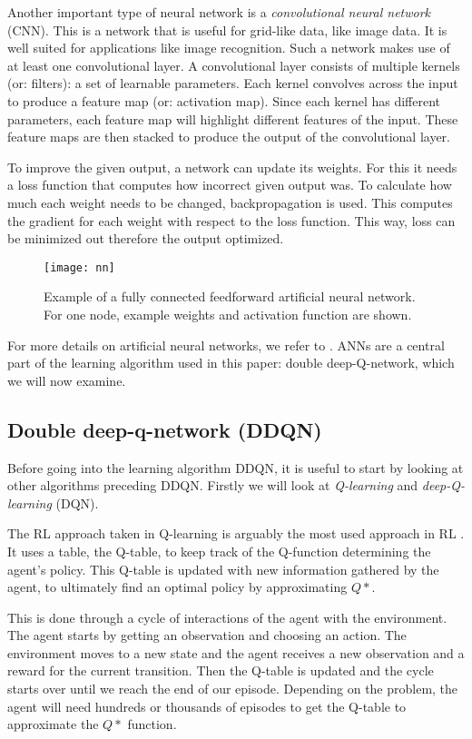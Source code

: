 Another important type of neural network is a \emph{convolutional neural network} (CNN). This is a network that is useful for grid-like data, like image data. It is well suited for applications like image recognition. Such a network makes use of at least one convolutional layer. A convolutional layer consists of multiple kernels (or: filters): a set of learnable parameters. Each kernel convolves across the input to produce a feature map (or: activation map). Since each kernel has different parameters, each feature map will highlight different features of the input. These feature maps are then stacked to produce the output of the convolutional layer.

To improve the given output, a network can update its weights. For this it needs a loss function that computes how incorrect given output was. To calculate how much each weight needs to be changed, backpropagation is used. This computes the gradient for each weight with respect to the loss function. This way, loss can be minimized out therefore the output optimized.

\begin{figure}[h]
    \centering
    \texttt{[image: nn]}
    \caption{Example of a fully connected feedforward artificial neural network. For one node, example weights and activation function are shown.}
    \label{fig:nn}
\end{figure}

For more details on artificial neural networks, we refer to \cite{nn}. ANNs are a central part of the learning algorithm used in this paper: double deep-Q-network, which we will now examine.

\subsection{Double deep-q-network (DDQN)}\label{pl-dqn}
Before going into the learning algorithm DDQN, it is useful to start by looking at other algorithms preceding DDQN. Firstly we will look at \emph{Q-learning} and \emph{deep-Q-learning} (DQN). 

The RL approach taken in Q-learning is arguably the most used approach in RL \cite{qlearning}. It uses a table, the Q-table, to keep track of the Q-function determining the agent's policy. This Q-table is updated with new information gathered by the agent, to ultimately find an optimal policy by approximating $Q*$.

This is done through a cycle of interactions of the agent with the environment. The agent starts by getting an observation and choosing an action. The environment moves to a new state and the agent receives a new observation and a reward for the current transition. Then the Q-table is updated and the cycle starts over until we reach the end of our episode. Depending on the problem, the agent will need hundreds or thousands of episodes to get the Q-table to approximate the $Q*$ function.

